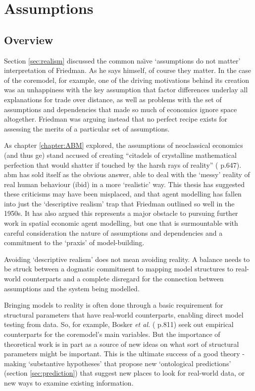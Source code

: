 \section{Assumptions \label{sec:concassumptions}}

\subsection{Overview}

Section \ref{sec:realism} discussed the common na\"{\i}ve `assumptions do not matter' interpretation of Friedman. As he says himself, of course they matter. In the case of the \gls{coremodel}, for example, one of the driving motivations behind its creation was an unhappiness with the key assumption that factor differences underlay all explanations for trade over distance, as well as problems with the set of assumptions and dependencies that made so much of economics ignore space altogether. Friedman was arguing instead that no perfect recipe exists for assessing the merits of a particular set of assumptions.

As chapter \ref{chapter:ABM} explored, the assumptions of neoclassical economics (and thus \gls{ge}) stand accused of creating ``citadels of crystalline mathematical perfection that would shatter if touched by the harsh rays of reality'' (\citealt{ball_social_2007} p.647). \gls{abm} has sold itself as the obvious answer, able to deal with the `messy' reality of real human behaviour (ibid) in a more `realistic' way. This thesis has suggested these criticisms may have been misplaced, and that agent modelling has fallen into just the `descriptive realism' trap that Friedman outlined so well in the 1950s. It has also argued this represents a major obstacle to pursuing further work in spatial economic agent modelling, but one that is surmountable with careful consideration the nature of assumptions and dependencies and a commitment to the `praxis' of model-building.

Avoiding `descriptive realism' does not mean avoiding reality. A balance needs to be struck between a dogmatic commitment to mapping model structures to real-world counterparts and a complete disregard for the connection between assumptions and the system being modelled. 

Bringing models to reality is often done through a basic requirement for structural parameters that have real-world counterparts, enabling direct model testing from data. So, for example, Bosker \emph{et al.} (\citeyear{bosker_adding_2010} p.811) seek out empirical counterparts for the \gls{coremodel}'s main variables. But the importance of theoretical work is in part as a source of new ideas on what sort of structural parameters might be important. This is the ultimate success of a good theory - making `substantive hypotheses' that propose new `ontological predictions' (section \ref{sec:prediction}) that suggest new places to look for real-world data, or new ways to examine existing information. 

